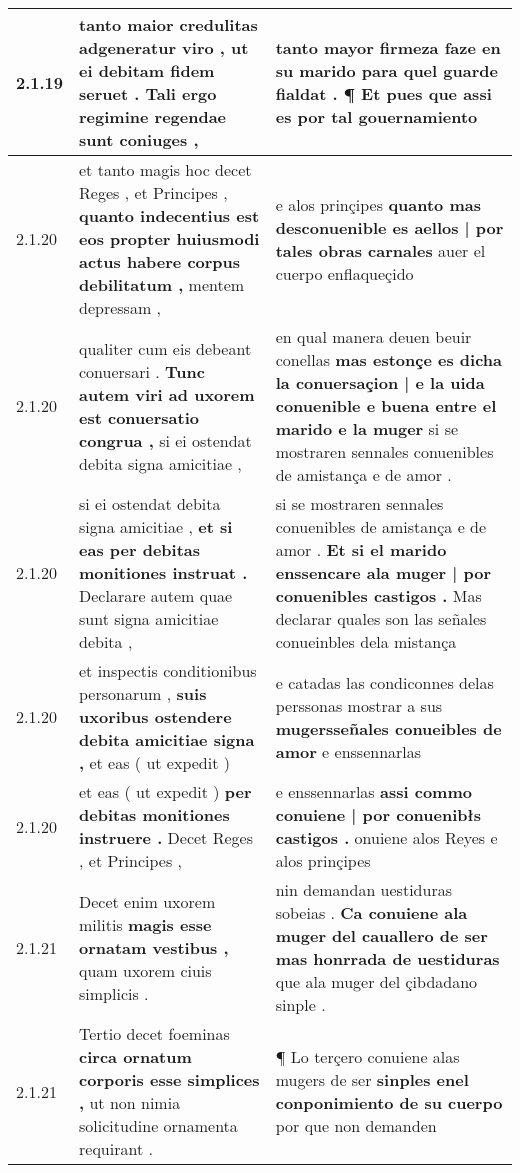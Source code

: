\begin{tabular}{|p{1cm}|p{6.5cm}|p{6.5cm}|}
2.1.19 & tanto maior credulitas adgeneratur viro , \textbf{ ut ei debitam fidem seruet . } Tali ergo regimine regendae sunt coniuges , & tanto mayor firmeza faze en su marido \textbf{ para quel guarde fialdat . } ¶ Et pues que assi es por tal gouernamiento \\\hline
2.1.20 & et tanto magis hoc decet Reges , et Principes , \textbf{ quanto indecentius est eos propter huiusmodi actus habere corpus debilitatum , } mentem depressam , & e alos prinçipes \textbf{ quanto mas desconuenible es aellos | por tales obras carnales } auer el cuerpo enflaqueçido \\\hline
2.1.20 & qualiter cum eis debeant conuersari . \textbf{ Tunc autem viri ad uxorem est conuersatio congrua , } si ei ostendat debita signa amicitiae , & en qual manera deuen beuir conellas \textbf{ mas estonçe es dicha la conuersaçion | e la uida conuenible e buena entre el marido e la muger } si se mostraren sennales conuenibles de amistança e de amor . \\\hline
2.1.20 & si ei ostendat debita signa amicitiae , \textbf{ et si eas per debitas monitiones instruat . } Declarare autem quae sunt signa amicitiae debita , & si se mostraren sennales conuenibles de amistança e de amor . \textbf{ Et si el marido enssencare ala muger | por conuenibles castigos . } Mas declarar quales son las señales conueinbles dela mistança \\\hline
2.1.20 & et inspectis conditionibus personarum , \textbf{ suis uxoribus ostendere debita amicitiae signa , } et eas ( ut expedit ) & e catadas las condiconnes delas perssonas mostrar a sus \textbf{ mugersseñales conueibles de amor } e enssennarlas \\\hline
2.1.20 & et eas ( ut expedit ) \textbf{ per debitas monitiones instruere . } Decet Reges , et Principes , & e enssennarlas \textbf{ assi commo conuiene | por conuenibłs castigos . } onuiene alos Reyes e alos prinçipes \\\hline
2.1.21 & Decet enim uxorem militis \textbf{ magis esse ornatam vestibus , } quam uxorem ciuis simplicis . & nin demandan uestiduras sobeias . \textbf{ Ca conuiene ala muger del cauallero de ser mas honrrada de uestiduras } que ala muger del çibdadano sinple . \\\hline
2.1.21 & Tertio decet foeminas \textbf{ circa ornatum corporis esse simplices , } ut non nimia solicitudine ornamenta requirant . & ¶ Lo terçero conuiene alas mugers de ser \textbf{ sinples enel conponimiento de su cuerpo } por que non demanden \\\hline

\end{tabular}
